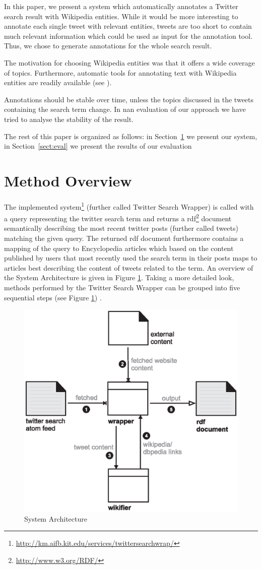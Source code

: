 \documentclass{llncs}
\begin{document}
In this paper, we present a system which automatically annotates a Twitter search result with Wikipedia entities. While it would be more interesting to annotate each single tweet with relevant entities, tweets are too short to contain much relevant information which could be used as input for the annotation tool. Thus, we chose to generate annotations for the whole search result. 

The motivation for choosing Wikipedia entities was that it offers a wide coverage of topics. Furthermore, automatic tools for annotating text with Wikipedia entities are readily available (see \cite{key:wikifier}).

Annotations should be stable over time, unless the topics discussed in the tweets containing the search term change. In nan evaluation of our approach we have tried to analyse the stability of the result.

The rest of this paper is organized as follows: in Section~\ref{sect:method} we present our system, in Section~\ref{sect:eval} we present the results of our evaluation

\section{Method Overview}
\label{sect:method}

The implemented
system\footnote{\url{http://km.aifb.kit.edu/services/twittersearchwrap/}}
(further called Twitter Search Wrapper) is called with a query representing
the twitter search term and returns a rdf\footnote{\url{http://www.w3.org/RDF/}}
document semantically describing the most recent twitter posts (further called tweets) matching the given query. The returned rdf
document furthermore contains a mapping of the query to Encyclopedia articles
which based on the content published by users that most recently used the search
term in their posts maps to articles best describing the content of tweets
related to the term. An overview of the System Architecture is given in Figure
\ref{fig:arch}. Taking a more detailed look, methods performed by the Twitter
Search Wrapper can be grouped into five sequential steps (see Figure
\ref{fig:arch}) .

 
\begin{figure}[htb]
  \centering
  \includegraphics[width=.6\linewidth]{architecture}
  \caption{System Architecture}
  \label{fig:arch}
\end{figure}
\end{document}
